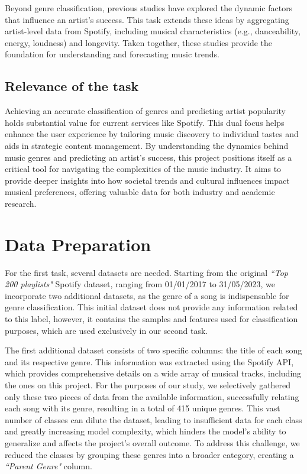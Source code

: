 \documentclass{article}
\begin{document}
Beyond genre classification, previous studies \cite{Mining_and_Forecasting_Career_Trajectories, Collaboration_Profiles_Impact} have explored the dynamic factors that influence an artist's success. This task extends these ideas by aggregating artist-level data from Spotify, including musical characteristics (e.g., danceability, energy, loudness) and longevity. 
Taken together, these studies provide the foundation for understanding and forecasting music trends.

\subsection{Relevance of the task}

Achieving an accurate classification of genres and predicting artist popularity holds substantial value for current services like Spotify. This dual focus helps enhance the user experience by tailoring music discovery to individual tastes and aids in strategic content management. By understanding the dynamics behind music genres and predicting an artist's success, this project positions itself as a critical tool for navigating the complexities of the music industry. It aims to provide deeper insights into how societal trends and cultural influences impact musical preferences, offering valuable data for both industry and academic research.

\section{Data Preparation}

For the first task, several datasets are needed. Starting from the original \textit{``Top 200 playlists"} Spotify dataset, ranging from 01/01/2017 to 31/05/2023, we incorporate two additional datasets, as the genre of a song is indispensable for genre classification. This initial dataset does not provide any information related to this label, however, it contains the samples and features used for classification purposes, which are used exclusively in our second task.

The first additional dataset consists of two specific columns: the title of each song and its respective genre. This information was extracted using the Spotify API, which provides comprehensive details on a wide array of musical tracks, including the ones on this project. For the purposes of our study, we selectively gathered only these two pieces of data from the available information, successfully relating each song with its genre, resulting in a total of 415 unique genres.
This vast number of classes can dilute the dataset, leading to insufficient data for each class and greatly increasing model complexity, which hinders the model's ability to generalize and affects the project's overall outcome. To address this challenge, we reduced the classes by grouping these genres into a broader category, creating a \textit{``Parent Genre"} column.  
\end{document}
